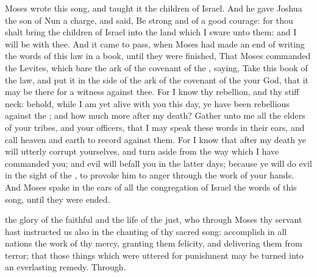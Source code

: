  Moses wrote this song, and taught it the children of Israel. And he gave Joshua the son of Nun a charge, and said, Be strong and of a good courage: for thou shalt bring the children of Israel into the land which I sware unto them: and I will be with thee. And it came to pass, when Moses had made an end of writing the words of this law in a book, until they were finished, That Moses commanded the Levites, which bare the ark of the covenant of the , saying, Take this book of the law, and put it in the side of the ark of the covenant of the  your God, that it may be there for a witness against thee. For I know thy rebellion, and thy stiff neck: behold, while I am yet alive with you this day, ye have been rebellious against the ; and how much more after my death? Gather unto me all the elders of your tribes, and your officers, that I may speak these words in their ears, and call heaven and earth to record against them. For I know that after my death ye will utterly corrupt yourselves, and turn aside from the way which I have commanded you; and evil will befall you in the latter days; because ye will do evil in the sight of the , to provoke him to anger through the work of your hands. And Moses spake in the ears of all the congregation of Israel the words of this song, until they were ended.


{} the glory of the faithful and the life of the just, who through Moses thy servant hast instructed us also in the chanting of thy sacred song: accomplish in all nations the work of thy mercy, granting them felicity, and delivering them from terror; that those things which were uttered for punishment may be turned into an everlasting remedy. Through.

